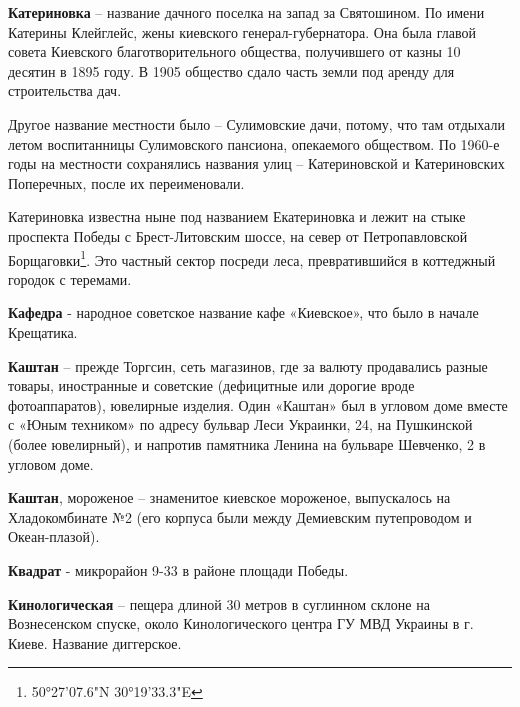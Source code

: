 \medskip

\textbf{Катериновка} – название дачного поселка на запад за Святошином. По имени Катерины Клейглейс, жены киевского генерал-губерна\-тора. Она была главой совета Киевского благотворительного общества, получившего от казны 10 десятин в 1895 году. В 1905 общество сдало часть земли под аренду для строительства дач.

Другое название местности было – Сулимовские дачи, потому, что там отдыхали летом воспитанницы Сулимовского пансиона, опекаемого обществом. По 1960-е годы на местности сохранялись названия улиц – Катериновской и Катериновских Поперечных, после их переименовали. 

Катериновка известна ныне под названием Екатериновка и лежит на стыке проспекта Победы с Брест-Литовским шоссе, на север от Петропавловской Борщаговки\footnote{50°27'07.6"N 30°19'33.3"E}. Это частный сектор посреди леса, превратившийся в коттеджный городок с теремами.\\

\medskip


\textbf{Кафедра} - народное советское название кафе «Киевское», что было в начале Крещатика.\\


\medskip


\textbf{Каштан} – прежде Торгсин, сеть магазинов, где за валюту продавались разные товары, иностранные и советские (дефицитные или дорогие вроде фотоаппаратов), ювелирные изделия. Один «Каштан» был в угловом доме вместе с «Юным техником» по адресу бульвар Леси Украинки, 24, на Пушкинской (более ювелирный), и напротив памятника Ленина на бульваре Шевченко, 2 в угловом доме.\\

\medskip

\textbf{Каштан}, мороженое – знаменитое киевское мороженое, выпускалось на Хладокомбинате №2 (его корпуса были между Демиевским путепроводом и Океан-плазой).\\

\medskip

\textbf{Квадрат} - микрорайон 9-33 в районе площади Победы.\\

\medskip

\textbf{Кинологическая} – пещера длиной 30 метров в суглинном склоне на Вознесенском спуске, около Кинологического центра ГУ МВД Украины в г. Киеве. Название диггерское.\\

\medskip

